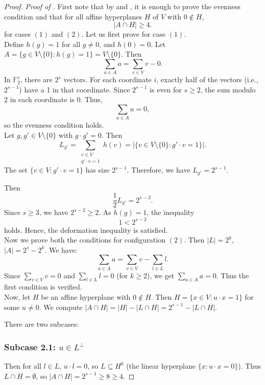 \documentclass[12pt,twoside,]{amsart}
\theoremstyle{plain}
\theoremstyle{definition}
\begin{document}
\begin{proof}
 \noindent\textit{Proof of .}
 First note that by  and , it is enough to prove the evenness condition and that for all affine hyperplanes $H$ of $V$ with $0 \notin H$,
    \[
    |A \cap H| \geq 4.
    \] 
    for cases $(1)$ and $(2)$. Let us first prove for case $(1)$. \\
 Define \( h(g) = 1 \) for all \( g \neq 0 \), and \( h(0) = 0 \). Let \( A = \{ g \in V \setminus \{0\} : h(g) = 1 \} = V \setminus \{0\} \). Then
\[
\sum_{a \in A} a = \sum_{v \in V} v - 0.
\]
In \( \mathbb{F}_2^s \), there are \( 2^s \) vectors. For each coordinate \( i \), exactly half of the vectors (i.e., \( 2^{s-1} \)) have a 1 in that coordinate. Since \( 2^{s-1} \) is even for \( s \geq 2 \), the sum modulo 2 in each coordinate is 0. Thus,
\[
\sum_{a \in A} a = 0,
\]
so the evenness condition holds. \\
Let \( g, g' \in V \setminus \{0\} \) with \( g \cdot g' = 0 \). Then
\[
L_{g'} = \sum_{\substack{v \in V \\ g' \cdot v = 1}} h(v) = |\{ v \in V \setminus \{0\} : g' \cdot v = 1 \}|.
\]
The set \( \{ v \in V : g' \cdot v = 1 \} \) has size \( 2^{s-1} \). Therefore, we have \( L_{g'} = 2^{s-1} \).

Then
\[
\frac{1}{2} L_{g'} = 2^{s-2}.
\]
Since \( s \geq 3 \), we have \( 2^{s-2} \geq 2 \). As \( h(g) = 1 \), the inequality
\[
1 < 2^{s-2}
\]
holds. Hence, the deformation inequality is satisfied. \\

Now we prove both the conditions for configuration $(2)$.
Then $|L| = 2^k$, $|A| = 2^s - 2^k$.
We have:
\[
\sum_{a \in A} a = \sum_{v \in V} v - \sum_{l \in L} l.
\]
Since $\sum_{v \in V} v = 0$ and $\sum_{l \in L} l = 0$ (for $k \geq 2$), 
we get $\sum_{a \in A} a = 0$. Thus the first condition is verified. \\
Now, let $H$ be an affine hyperplane with $0 \notin H$. Then $H = \{x \in V : u \cdot x = 1\}$ for some $u \neq 0$. We compute $|A \cap H| = |H| - |L \cap H| = 2^{s-1} - |L \cap H|$.

There are two subcases:

\subsubsection*{Subcase 2.1: $u \in L^\perp$}
Then for all $l \in L$, $u \cdot l = 0$, so $L \subseteq H^0$ (the linear hyperplane $\{x : u \cdot x = 0\}$).
Thus $L \cap H = \emptyset$, so $|A \cap H| = 2^{s-1} \geq 8 \geq 4$.


\end{proof}
\end{document}
